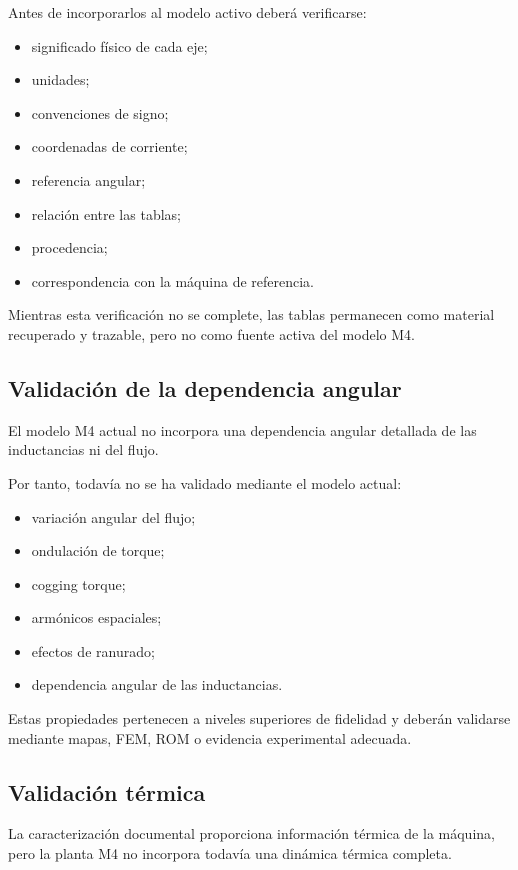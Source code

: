 Antes de incorporarlos al modelo activo deberá verificarse:

\begin{itemize}
    \item significado físico de cada eje;
    \item unidades;
    \item convenciones de signo;
    \item coordenadas de corriente;
    \item referencia angular;
    \item relación entre las tablas;
    \item procedencia;
    \item correspondencia con la máquina de referencia.
\end{itemize}

Mientras esta verificación no se complete, las tablas permanecen como material recuperado y trazable, pero no como fuente activa del modelo M4.

\subsection{Validación de la dependencia angular}

El modelo M4 actual no incorpora una dependencia angular detallada de las inductancias ni del flujo.

Por tanto, todavía no se ha validado mediante el modelo actual:

\begin{itemize}
    \item variación angular del flujo;
    \item ondulación de torque;
    \item cogging torque;
    \item armónicos espaciales;
    \item efectos de ranurado;
    \item dependencia angular de las inductancias.
\end{itemize}

Estas propiedades pertenecen a niveles superiores de fidelidad y deberán validarse mediante mapas, FEM, ROM o evidencia experimental adecuada.

\subsection{Validación térmica}

La caracterización documental proporciona información térmica de la máquina, pero la planta M4 no incorpora todavía una dinámica térmica completa.

